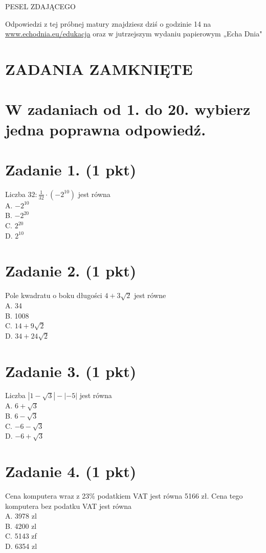 \documentclass[10pt]{article}
\begin{document}
PESEL ZDAJĄCEGO

Odpowiedzi z tej próbnej matury znajdziesz dziś o godzinie 14 na \href{http://www.echodnia.eu/edukacja}{www.echodnia.eu/edukacja} oraz w jutrzejszym wydaniu papierowym „Echa Dnia"

\section*{ZADANIA ZAMKNIĘTE}
\section*{W zadaniach od 1. do 20. wybierz jedna poprawna odpowiedź.}
\section*{Zadanie 1. (1 pkt)}
Liczba \(32: \frac{1}{32} \cdot\left(-2^{10}\right)\) jest równa\\
A. \(-2^{10}\)\\
B. \(-2^{20}\)\\
C. \(2^{20}\)\\
D. \(2^{10}\)

\section*{Zadanie 2. (1 pkt)}
Pole kwadratu o boku długości \(4+3 \sqrt{2}\) jest równe\\
A. 34\\
B. 1008\\
C. \(14+9 \sqrt{2}\)\\
D. \(34+24 \sqrt{2}\)

\section*{Zadanie 3. (1 pkt)}
Liczba \(|1-\sqrt{3}|-|-5|\) jest równa\\
A. \(6+\sqrt{3}\)\\
B. \(6-\sqrt{3}\)\\
C. \(-6-\sqrt{3}\)\\
D. \(-6+\sqrt{3}\)

\section*{Zadanie 4. (1 pkt)}
Cena komputera wraz z 23\% podatkiem VAT jest równa 5166 zł. Cena tego komputera bez podatku VAT jest równa\\
A. 3978 zl\\
B. 4200 zl\\
C. 5143 zf\\
D. 6354 zl
\end{document}
